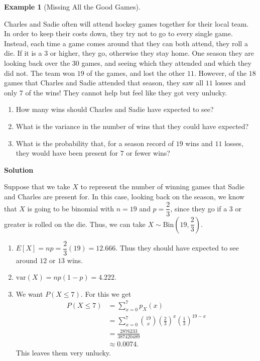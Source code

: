 \documentclass[
  letterpaper,
  DIV=11,
  numbers=noendperiod]{scrreprt}
\providecommand{\tightlist}{%
  \setlength{\itemsep}{0pt}\setlength{\parskip}{0pt}}\usepackage{longtable,booktabs,array}
\theoremstyle{definition}
\theoremstyle{definition}
\newtheorem{example}{Example}[chapter]
\theoremstyle{definition}
\theoremstyle{remark}
\begin{document}
\begin{example}[Missing All the Good
Games]\protect\hypertarget{exm-binomial}{}\label{exm-binomial}

Charles and Sadie often will attend hockey games together for their
local team. In order to keep their costs down, they try not to go to
every single game. Instead, each time a game comes around that they can
both attend, they roll a die. If it is a \(3\) or higher, they go,
otherwise they stay home. One season they are looking back over the
\(30\) games, and seeing which they attended and which they did not. The
team won \(19\) of the games, and lost the other \(11\). However, of the
\(18\) games that Charles and Sadie attended that season, they saw all
\(11\) losses and only \(7\) of the wins! They cannot help but feel like
they got very unlucky.

\begin{enumerate}
\def\labelenumi{\alph{enumi}.}
\tightlist
\item
  How many wins should Charles and Sadie have expected to see?
\item
  What is the variance in the number of wins that they could have
  expected?
\item
  What is the probability that, for a season record of \(19\) wins and
  \(11\) losses, they would have been present for \(7\) or fewer wins?
\end{enumerate}

\begin{tcolorbox}[enhanced jigsaw, colback=white, colframe=quarto-callout-color-frame, arc=.35mm, leftrule=.75mm, rightrule=.15mm, opacityback=0, breakable, bottomrule=.15mm, left=2mm, toprule=.15mm]

\vspace{-3mm}\textbf{Solution}\vspace{3mm}

Suppose that we take \(X\) to represent the number of winning games that
Sadie and Charles are present for. In this case, looking back on the
season, we know that \(X\) is going to be binomial with \(n=19\) and
\(p = \dfrac{2}{3}\), since they go if a \(3\) or greater is rolled on
the die. Thus, we can take \(X \sim \text{Bin}(19, \dfrac{2}{3})\).

\begin{enumerate}
\def\labelenumi{\alph{enumi}.}
\tightlist
\item
  \(E[X] = np = \dfrac{2}{3}(19) = 12.666\). Thus they should have
  expected to see around \(12\) or \(13\) wins.
\item
  \(\text{var}(X) = np(1-p) = 4.222\).
\item
  We want \(P(X \leq 7)\). For this we get \begin{align*}
  P(X \leq 7) &= \sum_{x=0}^7 p_X(x) \\
  &= \sum_{x=0}^7 \binom{19}{x}\left(\frac{2}{3}\right)^x\left(\frac{1}{3}\right)^{19-x} \\
  &= \frac{2876233}{387420489} \\
  &\approx 0.0074.
  \end{align*} This leaves them very unlucky.
\end{enumerate}


\end{tcolorbox}
\end{example}
\end{document}
